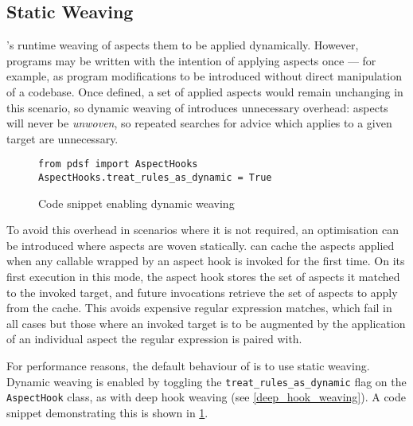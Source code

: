\subsection{Static Weaving}
\label{static_weaving}

\pdsf{}'s runtime weaving of aspects them to be applied dynamically. However,
programs may be written with the intention of applying aspects once --- for
example, as program modifications to be introduced without direct manipulation
of a codebase. Once defined, a set of applied aspects would remain unchanging in
this scenario, so dynamic weaving of \pdsf introduces unnecessary overhead:
aspects will never be \emph{unwoven}, so repeated searches for advice which
applies to a given target are unnecessary. 

\begin{figure}
    \begin{lstlisting}
from pdsf import AspectHooks
AspectHooks.treat_rules_as_dynamic = True
    \end{lstlisting}
    \caption{Code snippet enabling dynamic weaving}
    \label{fig:enabling_dynamic_weaving}
\end{figure}

To avoid this overhead in scenarios where it is not required, an optimisation
can be introduced where aspects are woven statically. \pdsf can cache the
aspects applied when any callable wrapped by an aspect hook is invoked for the
first time. On its first execution in this mode, the aspect hook stores the set
of aspects it matched to the invoked target, and future invocations retrieve the
set of aspects to apply from the cache. This avoids expensive regular expression
matches,
which fail in all cases but those where an invoked target is to be augmented by
the application of an individual aspect the regular expression is paired
with.

For performance reasons, the default behaviour of \pdsf is to use static
weaving. Dynamic weaving is enabled by toggling the
\lstinline{treat_rules_as_dynamic} flag on the \lstinline{AspectHook} class, as
with deep hook weaving (see \cref{deep_hook_weaving}). A code snippet
demonstrating this is shown in \cref{fig:enabling_dynamic_weaving}.


